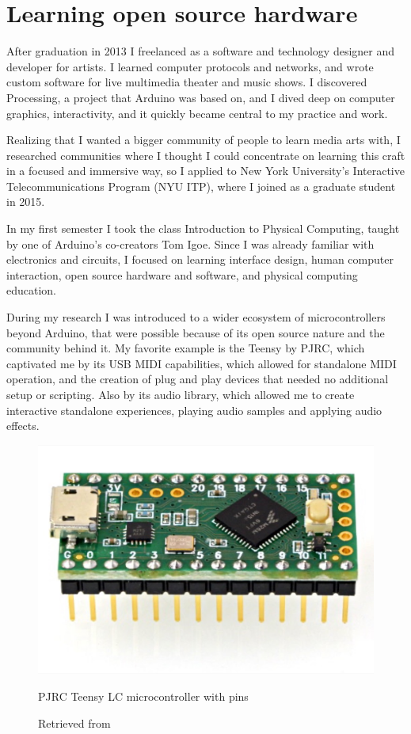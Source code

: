 \section{Learning open source hardware}

After graduation in 2013 I freelanced as a software and technology designer and developer for artists. I learned computer protocols and networks, and wrote custom software for live multimedia theater and music shows. I discovered Processing, a project that Arduino was based on, and I dived deep on computer graphics, interactivity, and it quickly became central to my practice and work.

Realizing that I wanted a bigger community of people to learn media arts with, I researched communities where I thought I could concentrate on learning this craft in a focused and immersive way, so I applied to New York University's Interactive Telecommunications Program (\acrshort{NYU} \acrshort{ITP}), where I joined as a graduate student in 2015. 

In my first semester I took the class Introduction to Physical Computing, taught by one of Arduino's co-creators Tom Igoe. Since I was already familiar with electronics and circuits, I focused on learning interface design, human computer interaction, open source hardware and software, and physical computing education.

During my research I was introduced to a wider ecosystem of microcontrollers beyond Arduino, that were possible because of its open source nature and the community behind it. My favorite example is the Teensy by PJRC, which captivated me by its USB MIDI capabilities, which allowed for standalone \acrshort{MIDI} operation, and the creation of plug and play devices that needed no additional setup or scripting. Also by its audio library, which allowed me to create interactive standalone experiences, playing audio samples and applying audio effects.

\begin{figure}[ht]
  \centering
  \includegraphics[width=0.75\linewidth,height=0.25\textheight,keepaspectratio]{images/pjrc-teensy-lc-with-pins.jpg}
  \caption{PJRC Teensy LC microcontroller with pins}
  \caption*{Retrieved from \cite{website-pjrc-teensy-lc-with-pins}}
  \label{fig:pjrc-teensy-lc-with-pins}
\end{figure}

